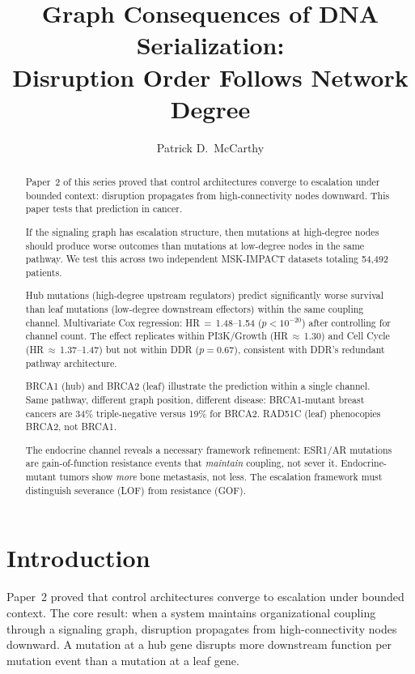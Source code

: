 \documentclass[11pt]{article}
\title{Graph Consequences of DNA Serialization:\\
Disruption Order Follows Network Degree}
\author{Patrick D.\ McCarthy}
\date{}
\begin{document}
\maketitle

\begin{abstract}
Paper~2 of this series proved that control architectures converge
to escalation under bounded context: disruption propagates from
high-connectivity nodes downward. This paper tests that prediction
in cancer.

If the signaling graph has escalation structure, then mutations at
high-degree nodes should produce worse outcomes than mutations at
low-degree nodes in the same pathway. We test this across two
independent MSK-IMPACT datasets totaling 54{,}492 patients.

Hub mutations (high-degree upstream regulators) predict significantly
worse survival than leaf mutations (low-degree downstream effectors)
within the same coupling channel. Multivariate Cox regression:
HR\,$=$\,1.48--1.54 ($p < 10^{-20}$) after controlling for channel
count. The effect replicates within PI3K/Growth
(HR\,$\approx$\,1.30) and Cell Cycle (HR\,$\approx$\,1.37--1.47)
but not within DDR ($p = 0.67$), consistent with DDR's redundant
pathway architecture.

BRCA1 (hub) and BRCA2 (leaf) illustrate the prediction within a
single channel. Same pathway, different graph position, different
disease: BRCA1-mutant breast cancers are 34\% triple-negative
versus 19\% for BRCA2. RAD51C (leaf) phenocopies BRCA2, not BRCA1.

The endocrine channel reveals a necessary framework refinement:
ESR1/AR mutations are gain-of-function resistance events that
\emph{maintain} coupling, not sever it. Endocrine-mutant tumors
show \emph{more} bone metastasis, not less. The escalation
framework must distinguish severance (LOF) from resistance (GOF).
\end{abstract}

\section{Introduction}
\label{sec:intro}

Paper~2 \cite{McCarthy2026b} proved that control architectures
converge to escalation under bounded context. The core result:
when a system maintains organizational coupling through a
signaling graph, disruption propagates from high-connectivity
nodes downward. A mutation at a hub gene disrupts more downstream
function per mutation event than a mutation at a leaf gene.
\end{document}
